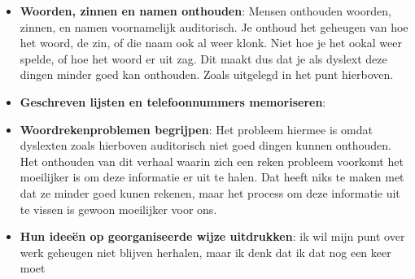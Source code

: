 \begin{itemize}
                    \item \textbf{Woorden, zinnen en namen onthouden}\cite{dyslextia-struggles-and-superpowers}:
                        Mensen onthouden woorden, zinnen, en namen voornamelijk auditorisch. Je onthoud het geheugen van hoe het woord, de zin, of die naam ook al weer klonk. Niet hoe je het ookal weer spelde, of hoe het woord er uit zag. Dit maakt dus dat je als dyslext deze dingen minder goed kan onthouden. Zoals uitgelegd in het punt hierboven.
                        
                    \item \textbf{Geschreven lijsten en telefoonnummers memoriseren}\cite{dyslextia-struggles-and-superpowers}:
                        
                    
                    \item \textbf{Woordrekenproblemen begrijpen}\cite{dyslextia-struggles-and-superpowers}:
                        Het probleem hiermee is omdat dyslexten zoals hierboven auditorisch niet goed dingen kunnen onthouden. Het onthouden van dit verhaal waarin zich een reken probleem voorkomt het moeilijker is om deze informatie er uit te halen. Dat heeft niks te maken met dat ze minder goed kunen rekenen, maar het process om deze informatie uit te vissen is gewoon moeilijker voor ons.
                        
                    \item \textbf{Hun ideeën op georganiseerde wijze uitdrukken}\cite{dyslextia-struggles-and-superpowers}:
                        ik wil mijn punt over werk geheugen niet blijven herhalen, maar ik denk dat ik dat nog een keer moet
                        
                \end{itemize}
                
